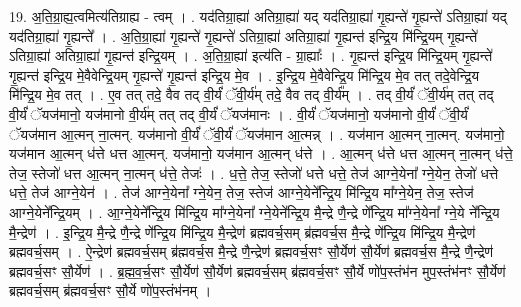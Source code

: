 \documentclass[17pt]{extarticle}
\begin{document}
19. अ॒ति॒ग्रा॒ह्य॒त्वमित्य॑तिग्राह्य - त्वम् । . यद॑तिग्रा॒ह्या॑ अतिग्रा॒ह्या॑ यद् यद॑तिग्रा॒ह्या॑ गृ॒ह्यन्ते॑ गृ॒ह्यन्ते॑ ऽतिग्रा॒ह्या॑ यद् यद॑तिग्रा॒ह्या॑ गृ॒ह्यन्ते᳚ । . अ॒ति॒ग्रा॒ह्या॑ गृ॒ह्यन्ते॑ गृ॒ह्यन्ते॑ ऽतिग्रा॒ह्या॑ अतिग्रा॒ह्या॑ गृ॒ह्यन्त॑ इन्द्रि॒य मि॑न्द्रि॒यम् गृ॒ह्यन्ते॑ ऽतिग्रा॒ह्या॑ अतिग्रा॒ह्या॑ गृ॒ह्यन्त॑ इन्द्रि॒यम् । . अ॒ति॒ग्रा॒ह्या॑ इत्य॑ति - ग्रा॒ह्याः᳚ । . गृ॒ह्यन्त॑ इन्द्रि॒य मि॑न्द्रि॒यम् गृ॒ह्यन्ते॑ गृ॒ह्यन्त॑ इन्द्रि॒य मे॒वैवेन्द्रि॒यम् गृ॒ह्यन्ते॑ गृ॒ह्यन्त॑ इन्द्रि॒य मे॒व । . इ॒न्द्रि॒य मे॒वैवेन्द्रि॒य मि॑न्द्रि॒य मे॒व तत् तदे॒वेन्द्रि॒य मि॑न्द्रि॒य मे॒व तत् । . ए॒व तत् तदे॒ वैव तद् वी॒र्यं॑ ॅवी॒र्य॑म् तदे॒ वैव तद् वी॒र्य᳚म् । . तद् वी॒र्यं॑ ॅवी॒र्य॑म् तत् तद् वी॒र्यं॑ ॅयज॑मानो॒ यज॑मानो वी॒र्य॑म् तत् तद् वी॒र्यं॑ ॅयज॑मानः । . वी॒र्यं॑ ॅयज॑मानो॒ यज॑मानो वी॒र्यं॑ ॅवी॒र्यं॑ ॅयज॑मान आ॒त्मन् ना॒त्मन्. यज॑मानो वी॒र्यं॑ ॅवी॒र्यं॑ ॅयज॑मान आ॒त्मन्न् । . यज॑मान आ॒त्मन् ना॒त्मन्. यज॑मानो॒ यज॑मान आ॒त्मन् ध॑त्ते धत्त आ॒त्मन्. यज॑मानो॒ यज॑मान आ॒त्मन् ध॑त्ते । . आ॒त्मन् ध॑त्ते धत्त आ॒त्मन् ना॒त्मन् ध॑त्ते॒ तेज॒ स्तेजो॑ धत्त आ॒त्मन् ना॒त्मन् ध॑त्ते॒ तेजः॑ । . ध॒त्ते॒ तेज॒ स्तेजो॑ धत्ते धत्ते॒ तेज॑ आग्ने॒येना᳚ ग्ने॒येन॒ तेजो॑ धत्ते धत्ते॒ तेज॑ आग्ने॒येन॑ । . तेज॑ आग्ने॒येना᳚ ग्ने॒येन॒ तेज॒ स्तेज॑ आग्ने॒येने᳚न्द्रि॒य मि॑न्द्रि॒य मा᳚ग्ने॒येन॒ तेज॒ स्तेज॑ आग्ने॒येने᳚न्द्रि॒यम् । . आ॒ग्ने॒येने᳚न्द्रि॒य मि॑न्द्रि॒य मा᳚ग्ने॒येना᳚ ग्ने॒येने᳚न्द्रि॒य मै॒न्द्रे णै॒न्द्रे णे᳚न्द्रि॒य मा᳚ग्ने॒येना᳚ ग्ने॒ये
ने᳚न्द्रि॒य मै॒न्द्रेण॑ । . इ॒न्द्रि॒य मै॒न्द्रे णै॒न्द्रे णे᳚न्द्रि॒य मि॑न्द्रि॒य मै॒न्द्रेण॑ ब्रह्मवर्च॒सम् ब्र॑ह्मवर्च॒स मै॒न्द्रे णे᳚न्द्रि॒य मि॑न्द्रि॒य मै॒न्द्रेण॑ ब्रह्मवर्च॒सम् । . ऐ॒न्द्रेण॑ ब्रह्मवर्च॒सम् ब्र॑ह्मवर्च॒स मै॒न्द्रे णै॒न्द्रेण॑ ब्रह्मवर्च॒सꣳ सौ॒र्येण॑ सौ॒र्येण॑ ब्रह्मवर्च॒स मै॒न्द्रे णै॒न्द्रेण॑ ब्रह्मवर्च॒सꣳ सौ॒र्येण॑ । . ब्र॒ह्म॒व॒र्च॒सꣳ सौ॒र्येण॑ सौ॒र्येण॑ ब्रह्मवर्च॒सम् ब्र॑ह्मवर्च॒सꣳ सौ॒र्ये णो॑प॒स्तंभ॑न मुप॒स्तंभ॑नꣳ सौ॒र्येण॑ ब्रह्मवर्च॒सम् ब्र॑ह्मवर्च॒सꣳ सौ॒र्ये णो॑प॒स्तंभ॑नम् । \newline
\end{document}

